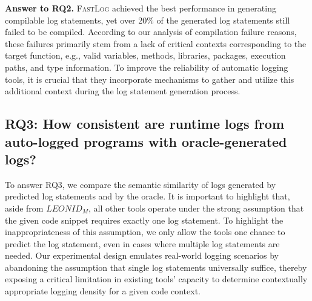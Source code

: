 \begin{tcolorbox}
    \textbf{Answer to RQ2.} \textsc{FastLog} achieved the best performance in generating compilable log statements, yet over 20\% of the generated log statements still failed to be compiled. According to our analysis of compilation failure reasons, these failures primarily stem from a lack of critical contexts corresponding to the target function, e.g., valid variables, methods, libraries, packages, execution paths, and type information. To improve the reliability of automatic logging tools, it is crucial that they incorporate mechanisms to gather and utilize this additional context during the log statement generation process.
\end{tcolorbox}
 
\subsection{RQ3: How consistent are runtime logs from auto-logged programs with oracle-generated logs?}
\label{rq3}
To answer RQ3, we compare the semantic similarity of logs generated by predicted log statements and by the oracle.
It is important to highlight that, aside from \(LEONID_M\), all other tools operate under the strong assumption that the given code snippet requires exactly one log statement. 
To highlight the inappropriateness of this assumption, we only allow the tools one chance to predict the log statement, even in cases where multiple log statements are needed. 
Our experimental design emulates real-world logging scenarios by abandoning the assumption that single log statements universally suffice, thereby exposing a critical limitation in existing tools' capacity to determine contextually appropriate logging density for a given code context.



